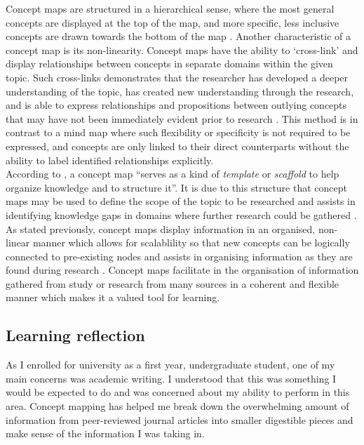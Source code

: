 \documentclass[12pt,a4paper]{report}
\begin{document}
Concept maps are structured in a hierarchical sense, where the most general concepts are displayed at the top of the map, and more specific, less inclusive concepts are drawn towards the bottom of the map \citep{Novak2006}. Another characteristic of a concept map is its non-linearity. Concept maps have the ability to `cross-link' and display relationships between concepts in separate domains within the given topic. Such cross-links demonstrates that the researcher has developed a deeper understanding of the topic, has created new understanding through the research, and is able to express relationships and propositions between outlying concepts that may have not been immediately evident prior to research \citep{Novak2006}. This method is in contrast to a mind map where such flexibility or specificity is not required to be expressed, and concepts are only linked to their direct counterparts without the ability to label identified relationships explicitly.\\

According to \citet[pp.1]{Novak2006}, a concept map ``serves as a kind of \emph{template} or \emph{scaffold} to help organize knowledge and to structure it''. It is due to this structure that concept maps may be used to define the scope of the topic to be researched and assists in identifying knowledge gaps in domains where further research could be gathered \citep{Novak2006}. As stated previously, concept maps display information in an organised, non-linear manner which allows for scalablility so that new concepts can be logically connected to pre-existing nodes and assists in organising information as they are found during research \citep{Novak2006}. Concept maps facilitate in the organisation of information gathered from study or research from many sources in a coherent and flexible manner which makes it a valued tool for learning.

\newpage
\subsection*{\textsf{Learning reflection}}

As I enrolled for university as a first year, undergraduate student, one of my main concerns was academic writing. I understood that this was something I would be expected to do and was concerned about my ability to perform in this area. Concept mapping has helped me break down the overwhelming amount of information from peer-reviewed journal articles into smaller digestible pieces and make sense of the information I was taking in.\\
\end{document}
